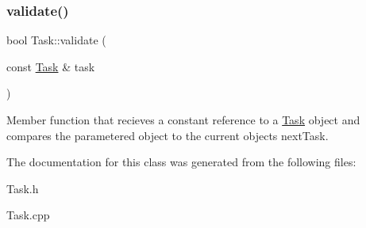 \subsubsection{\texorpdfstring{validate()}{validate()}}
{\footnotesize\ttfamily bool Task\+::validate (\begin{DoxyParamCaption}\item[{const \mbox{\hyperlink{classTask}{Task}} \&}]{task }\end{DoxyParamCaption})}

Member function that recieves a constant reference to a \mbox{\hyperlink{classTask}{Task}} object and compares the parametered object to the current object\textquotesingle{}s next\+Task. 

The documentation for this class was generated from the following files\+:\begin{DoxyCompactItemize}
\item 
Task.\+h\item 
Task.\+cpp\end{DoxyCompactItemize}
